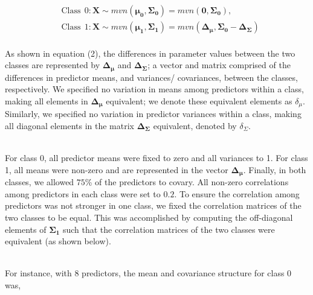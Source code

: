 \documentclass[AMA,STIX1COL,]{WileyNJD-v2}
\begin{document}
\begin{align}
&\mathrm{Class \ \  0:} \mathbf{X} \sim mvn( \pmb{\mu_0}, \pmb{\Sigma_0}) = mvn(\pmb{0}, \pmb{\Sigma_0}), \\
&\mathrm{Class \ \  1:} \mathbf{X} \sim mvn( \pmb{\mu_1}, \pmb{\Sigma_1}) = mvn(\pmb{\Delta_\mu}, \pmb{\Sigma_0} - \pmb{\Delta_\Sigma})
\end{align}\\
As shown in equation (2), the differences in parameter values between
the two classes are represented by \(\pmb{\Delta_\mu}\) and
\(\pmb{\Delta_\Sigma}\); a vector and matrix comprised of the
differences in predictor means, and variances/ covariances, between the
classes, respectively. We specified no variation in means among
predictors within a class, making all elements in \(\pmb{\Delta_\mu}\)
equivalent; we denote these equivalent elements as \(\delta_\mu\).
Similarly, we specified no variation in predictor variances within a
class, making all diagonal elements in the matrix
\(\pmb{\Delta_\Sigma}\) equivalent, denoted by \(\delta_\Sigma\).\\
\strut \\
For class 0, all predictor means were fixed to zero and all variances to
1. For class 1, all means were non-zero and are represented in the
vector \(\pmb{\Delta_\mu}\). Finally, in both classes, we allowed
\(75\)\% of the predictors to covary. All non-zero correlations among
predictors in each class were set to \(0.2\). To ensure the correlation
among predictors was not stronger in one class, we fixed the correlation
matrices of the two classes to be equal. This was accomplished by
computing the off-diagonal elements of \(\pmb{\Sigma_1}\) such that the
correlation matrices of the two classes were equivalent (as shown
below).\\
\strut \\
For instance, with 8 predictors, the mean and covariance structure for
class 0 was,\\
\end{document}
